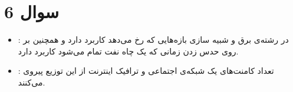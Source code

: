 \section*{سوال 6}
\begin{itemize}
    \item {}: در رشته‌ی برق و شبیه سازی بازه‌هایی که  رخ می‌دهد کاربرد دارد و همچنین بر روی حدس زدن زمانی که یک چاه نفت تمام می‌شود کاربرد دارد.
    \item {}: تعداد کامنت‌های یک شبکه‌ی اجتماعی و ترافیک اینترنت از این توزیع پیروی می‌کنند.
\end{itemize}